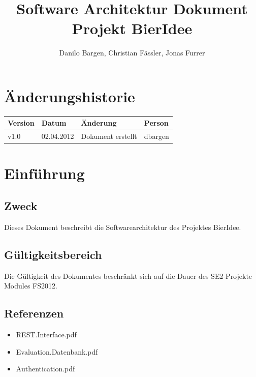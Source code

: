\documentclass[10pt,a4paper]{scrartcl}
\author{Danilo Bargen, Christian Fässler, Jonas Furrer}
\title{Software Architektur Dokument\\ Projekt BierIdee}
\begin{document}
\begin{titlepage}
	\maketitle
	\vspace{120mm}
	\thispagestyle{empty} %
\end{titlepage}

\tableofcontents
\newpage

\section*{Änderungshistorie}
\begin{tabular}{p{}p{}p{}p{}}
\toprule
\textbf{Version} & \textbf{Datum} & \textbf{Änderung} & \textbf{Person} \\  
\midrule
v1.0 & 02.04.2012 & Dokument erstellt & dbargen \\  
\bottomrule
\end{tabular} 
\newpage

\section{Einführung}

\subsection{Zweck}
Dieses Dokument beschreibt die Softwarearchitektur des Projektes BierIdee.

\subsection{Gültigkeitsbereich}
Die Gültigkeit des Dokumentes beschränkt sich auf die Dauer des SE2-Projekte Modules FS2012.

\subsection{Referenzen}

\begin{itemize}
	\item REST.Interface.pdf
	\item Evaluation.Datenbank.pdf
	\item Authentication.pdf
\end{itemize}
\end{document}
